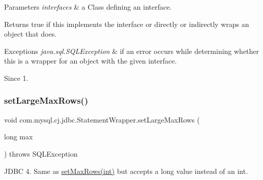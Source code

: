 \begin{DoxyParams}{Parameters}
{\em interfaces} & a Class defining an interface. \\
\hline
\end{DoxyParams}
\begin{DoxyReturn}{Returns}
true if this implements the interface or directly or indirectly wraps an object that does. 
\end{DoxyReturn}

\begin{DoxyExceptions}{Exceptions}
{\em java.\+sql.\+S\+Q\+L\+Exception} & if an error occurs while determining whether this is a wrapper for an object with the given interface. \\
\hline
\end{DoxyExceptions}
\begin{DoxySince}{Since}
1. 
\end{DoxySince}
\mbox{\label{classcom_1_1mysql_1_1cj_1_1jdbc_1_1_statement_wrapper_ab2e820896ea1e4ae65f5151dfca8af5f}} 
\subsubsection{\texorpdfstring{set\+Large\+Max\+Rows()}{setLargeMaxRows()}}
{\footnotesize\ttfamily void com.\+mysql.\+cj.\+jdbc.\+Statement\+Wrapper.\+set\+Large\+Max\+Rows (\begin{DoxyParamCaption}\item[{long}]{max }\end{DoxyParamCaption}) throws S\+Q\+L\+Exception}

J\+D\+BC 4. Same as \mbox{\hyperlink{}{set\+Max\+Rows(int)}} but accepts a long value instead of an int. \mbox{\label{classcom_1_1mysql_1_1cj_1_1jdbc_1_1_statement_wrapper_ab5729968dd5a079a6fabb69c3e1dde40}} 
